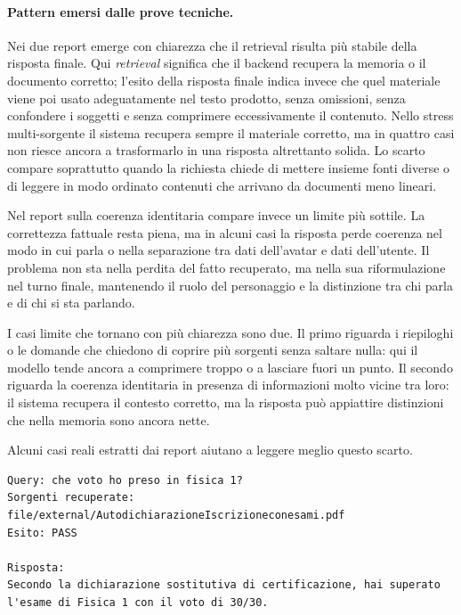 \paragraph{Pattern emersi dalle prove tecniche.}
Nei due report emerge con chiarezza che il retrieval risulta più stabile della risposta finale. Qui \emph{retrieval} significa che il backend recupera la memoria o il documento corretto; l'esito della risposta finale indica invece che quel materiale viene poi usato adeguatamente nel testo prodotto, senza omissioni, senza confondere i soggetti e senza comprimere eccessivamente il contenuto. Nello stress multi-sorgente il sistema recupera sempre il materiale corretto, ma in quattro casi non riesce ancora a trasformarlo in una risposta altrettanto solida. Lo scarto compare soprattutto quando la richiesta chiede di mettere insieme fonti diverse o di leggere in modo ordinato contenuti che arrivano da documenti meno lineari.

Nel report sulla coerenza identitaria compare invece un limite più sottile. La correttezza fattuale resta piena, ma in alcuni casi la risposta perde coerenza nel modo in cui parla o nella separazione tra dati dell'avatar e dati dell'utente. Il problema non sta nella perdita del fatto recuperato, ma nella sua riformulazione nel turno finale, mantenendo il ruolo del personaggio e la distinzione tra chi parla e di chi si sta parlando.

I casi limite che tornano con più chiarezza sono due. Il primo riguarda i riepiloghi o le domande che chiedono di coprire più sorgenti senza saltare nulla: qui il modello tende ancora a comprimere troppo o a lasciare fuori un punto. Il secondo riguarda la coerenza identitaria in presenza di informazioni molto vicine tra loro: il sistema recupera il contesto corretto, ma la risposta può appiattire distinzioni che nella memoria sono ancora nette.

Alcuni casi reali estratti dai report aiutano a leggere meglio questo scarto.

\begin{lstlisting}[style=sfpayload,title={Caso riuscito - grounding documentale},caption={Query e risposta riuscita dal report di stress multi-sorgente.}]
Query: che voto ho preso in fisica 1?
Sorgenti recuperate: file/external/AutodichiarazioneIscrizioneconesami.pdf
Esito: PASS

Risposta:
Secondo la dichiarazione sostitutiva di certificazione, hai superato
l'esame di Fisica 1 con il voto di 30/30.
\end{lstlisting}

